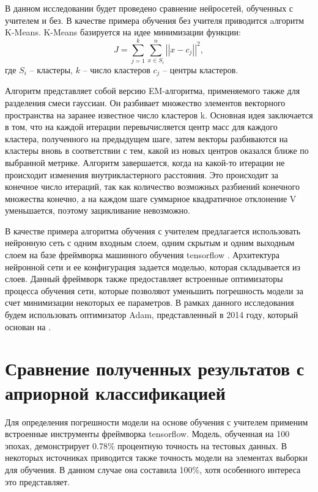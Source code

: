 В данном исследовании будет проведено сравнение
нейросетей, обученных с учителем и без. В качестве примера обучения без учителя приводится aлгоритм K-Means.
K-Means базируется на идее минимизации функции:
\begin{equation}
	J = \sum_{j=1}^k \sum_{x \in S_i}^n \left|\left| x - c_j\right|\right|^2,
\end{equation}
где $S_i$ -- кластеры, $k$ -- число кластеров $c_j$ -- центры кластеров.

Алгоритм представляет собой версию EM-алгоритма, применяемого также для разделения смеси гауссиан. Он разбивает множество элементов векторного пространства на заранее известное число кластеров k.
Основная идея заключается в том, что на каждой итерации перевычисляется центр масс для каждого кластера, полученного на предыдущем шаге, затем векторы разбиваются на кластеры вновь в соответствии с тем, какой из новых центров оказался ближе по выбранной метрике.
Алгоритм завершается, когда на какой-то итерации не происходит изменения внутрикластерного расстояния. Это происходит за конечное число итераций, так как количество возможных разбиений конечного множества конечно, а на каждом шаге суммарное квадратичное отклонение V уменьшается, поэтому зацикливание невозможно.

В качестве примера алгоритма обучения с учителем предлагается использовать нейронную сеть с одним входным слоем, одним скрытым и одним выходным слоем на базе фреймворка машинного обучения tensorflow \cite{tensorflow}.
Архитектура нейронной сети и ее конфигурация задается моделью, которая складывается из слоев. 
Данный фреймворк также предоставляет встроенные оптимизаторы процесса обучения сети, которые позволяют уменьшить погрешность модели за счет минимизации некоторых ее параметров. В рамках данного исследования будем использовать оптимизатор Adam, представленный в 2014 году, который основан на  \cite{adam}.


\chapter{Сравнение полученных результатов с априорной классификацией}

Для определения погрешности модели на основе обучения с учителем применим встроенные инструменты фреймворка tensorflow.
Модель, обученная на 100 эпохах, демонстрирует 0.78\% процентную точность на тестовых данных. В некоторых источниках приводится также точность модели на элементах выборки для обучения. В данном случае она составила 100\%, хотя особенного интереса это представляет.


